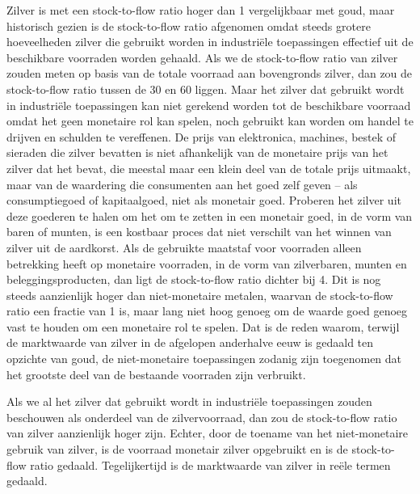 Zilver is met een stock-to-flow ratio hoger dan 1 vergelijkbaar met goud, maar historisch gezien is de stock-to-flow ratio afgenomen omdat steeds grotere hoeveelheden zilver die gebruikt worden in industriële toepassingen effectief uit de beschikbare voorraden worden gehaald. Als we de stock-to-flow ratio van zilver zouden meten op basis van de totale voorraad aan bovengronds zilver, dan zou de stock-to-flow ratio tussen de 30 en 60 liggen.\autocite{113} Maar het zilver dat gebruikt wordt in industriële toepassingen kan niet gerekend worden tot de beschikbare voorraad omdat het geen monetaire rol kan spelen, noch gebruikt kan worden om handel te drijven en schulden te vereffenen. De prijs van elektronica, machines, bestek of sieraden die zilver bevatten is niet afhankelijk van de monetaire prijs van het zilver dat het bevat, die meestal maar een klein deel van de totale prijs uitmaakt, maar van de waardering die consumenten aan het goed zelf geven -- als consumptiegoed of kapitaalgoed, niet als monetair goed. Proberen het zilver uit deze goederen te halen om het om te zetten in een monetair goed, in de vorm van baren of munten, is een kostbaar proces dat niet verschilt van het winnen van zilver uit de aardkorst. Als de gebruikte maatstaf voor voorraden alleen betrekking heeft op monetaire voorraden, in de vorm van zilverbaren, munten en beleggingsproducten, dan ligt de stock-to-flow ratio dichter bij 4. Dit is nog steeds aanzienlijk hoger dan niet-monetaire metalen, waarvan de stock-to-flow ratio een fractie van 1 is, maar lang niet hoog genoeg om de waarde goed genoeg vast te houden om een monetaire rol te spelen. Dat is de reden waarom, terwijl de marktwaarde van zilver in de afgelopen anderhalve eeuw is gedaald ten opzichte van goud, de niet-monetaire toepassingen zodanig zijn toegenomen dat het grootste deel van de bestaande voorraden zijn verbruikt.

Als we al het zilver dat gebruikt wordt in industriële toepassingen zouden beschouwen als onderdeel van de zilvervoorraad, dan zou de stock-to-flow ratio van zilver aanzienlijk hoger zijn. Echter, door de toename van het niet-monetaire gebruik van zilver, is de voorraad monetair zilver opgebruikt en is de stock-to-flow ratio gedaald. Tegelijkertijd is de marktwaarde van zilver in reële termen gedaald.

